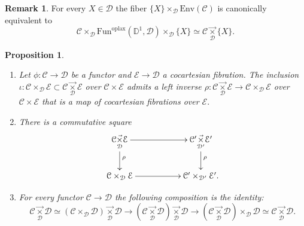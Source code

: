 \documentclass[10pt,oneside]{article}
\numberwithin{equation}{section} %
\numberwithin{figure}{section} %
\theoremstyle{plain}
\newtheorem{proposition}[theorem]{Proposition}
\theoremstyle{definition}
\newtheorem{remark}[theorem]{Remark}
\newcommand{\bD}{{\mathbb D}}
\newcommand{\mC}{{\mathcal C}}
\newcommand{\mD}{{\mathcal D}}
\newcommand{\mE}{{\mathcal E}}
\newcommand{\Env}{{\mathrm{Env}}}
\newcommand{\Fun}{\mathrm{Fun}}
\newcommand{\oplax}{{\mathrm{oplax}}}
\begin{document}
\begin{remark}
For every $X \in \mD$ the fiber $\{X\} \times_\mD \Env(\mC)$
is canonically equivalent to $$ \mC \times_{\mD} \Fun^\oplax(\bD^1,\mD) \times_\mD \{X\} \simeq \mC \underset{\mD}{\vec{\times}} \{X\} .$$

    
\end{remark}

\begin{proposition}\label{envo}

\begin{enumerate}[\normalfont(1)]\setlength{\itemsep}{-2pt}

\item Let $\phi: \mC \to \mD$ be a functor and $\mE \to \mD $ a cocartesian fibration.
The inclusion $\iota: \mC \times_\mD \mE \subset \mC \underset{\mD}{\vec{\times}} \mE$ over $\mC \times \mE$ admits a left inverse
$\rho: \mC \underset{\mD}{\vec{\times}} \mE \to \mC \times_\mD \mE$ over $\mC \times \mE$ that is a map of cocartesian fibrations over $\mE.$



\item 
There is a commutative square
\[
\xymatrix{
\mC \underset{\mD}{\vec{\times}} \mE \ar[rr]^{} \ar[d]^{\rho} && \mC' \underset{\mD'}{\vec{\times}} \mE' \ar[d]^{\rho} \\
\mC \times_\mD \mE \ar[rr] && \mC' \times_{\mD'} \mE'.}
\]

\item For every functor $\mC \to \mD $ the following composition is the identity: 
$$ \mC \underset{\mD}{\vec{\times}} \mD \simeq (\mC \times_\mD \mD) \underset{\mD}{\vec{\times}} \mD \to (\mC \underset{\mD}{\vec{\times}} \mD) \underset{\mD}{\vec{\times}} \mD \to (\mC \underset{\mD}{\vec{\times}} \mD) \times_\mD \mD \simeq  \mC \underset{\mD}{\vec{\times}} \mD. $$
\end{enumerate}
    
\end{proposition}
\end{document}
